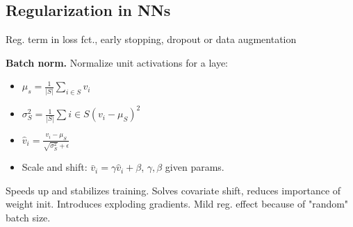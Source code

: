 \subsection{Regularization in NNs}

Reg. term in loss fct., early stopping, dropout or data augmentation

\textbf{Batch norm.} Normalize unit activations for a laye:
\begin{itemize}
    \item $\mu_s = \frac{1}{|S|}\sum_{i\in S}v_i$
    \item $\sigma_S^2 = \frac{1}{|S|}\sum{i\in S}(v_i - \mu_S)^2$
    \item $\hat{v}_i = \frac{v_i - \mu_S}{\sqrt{\sigma_S^2} + \epsilon}$
    \item Scale and shift: $\bar{v}_i = \gamma\hat{v}_i + \beta$, $\gamma,\beta$ given params.
\end{itemize}
Speeds up and stabilizes training. Solves covariate shift, reduces importance of weight init. Introduces exploding gradients. Mild reg. effect because of "random" batch size.